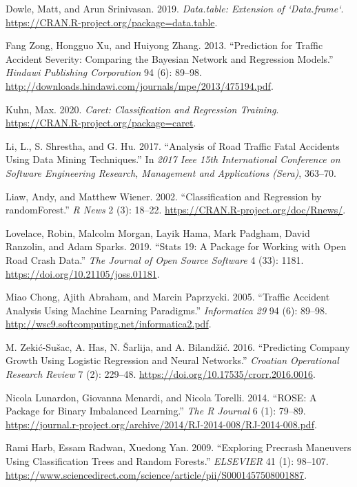 \documentclass[
  a4paper,
]{article}
\begin{document}
\leavevmode\hypertarget{ref-omit}{}%
Dowle, Matt, and Arun Srinivasan. 2019. \emph{Data.table: Extension of
`Data.frame`}. \url{https://CRAN.R-project.org/package=data.table}.

\leavevmode\hypertarget{ref-zong}{}%
Fang Zong, Hongguo Xu, and Huiyong Zhang. 2013. ``Prediction for Traffic
Accident Severity: Comparing the Bayesian Network and Regression
Models.'' \emph{Hindawi Publishing Corporation} 94 (6): 89--98.
\url{http://downloads.hindawi.com/journals/mpe/2013/475194.pdf}.

\leavevmode\hypertarget{ref-caret}{}%
Kuhn, Max. 2020. \emph{Caret: Classification and Regression Training}.
\url{https://CRAN.R-project.org/package=caret}.

\leavevmode\hypertarget{ref-7965753}{}%
Li, L., S. Shrestha, and G. Hu. 2017. ``Analysis of Road Traffic Fatal
Accidents Using Data Mining Techniques.'' In \emph{2017 Ieee 15th
International Conference on Software Engineering Research, Management
and Applications (Sera)}, 363--70.

\leavevmode\hypertarget{ref-random}{}%
Liaw, Andy, and Matthew Wiener. 2002. ``Classification and Regression by
randomForest.'' \emph{R News} 2 (3): 18--22.
\url{https://CRAN.R-project.org/doc/Rnews/}.

\leavevmode\hypertarget{ref-stats}{}%
Lovelace, Robin, Malcolm Morgan, Layik Hama, Mark Padgham, David
Ranzolin, and Adam Sparks. 2019. ``Stats 19: A Package for Working with
Open Road Crash Data.'' \emph{The Journal of Open Source Software} 4
(33): 1181. \url{https://doi.org/10.21105/joss.01181}.

\leavevmode\hypertarget{ref-Informatica}{}%
Miao Chong, Ajith Abraham, and Marcin Paprzycki. 2005. ``Traffic
Accident Analysis Using Machine Learning Paradigms.'' \emph{Informatica
29} 94 (6): 89--98.
\url{http://wsc9.softcomputing.net/informatica2.pdf}.

\leavevmode\hypertarget{ref-zekic}{}%
M. Zekić-Sušac, A. Has, N. Šarlija, and A. Bilandžić. 2016. ``Predicting
Company Growth Using Logistic Regression and Neural Networks.''
\emph{Croatian Operational Research Review} 7 (2): 229--48.
\url{https://doi.org/10.17535/crorr.2016.0016}.

\leavevmode\hypertarget{ref-rose}{}%
Nicola Lunardon, Giovanna Menardi, and Nicola Torelli. 2014. ``ROSE: A
Package for Binary Imbalanced Learning.'' \emph{The R Journal} 6 (1):
79--89.
\url{https://journal.r-project.org/archive/2014/RJ-2014-008/RJ-2014-008.pdf}.

\leavevmode\hypertarget{ref-harb}{}%
Rami Harb, Essam Radwan, Xuedong Yan. 2009. ``Exploring Precrash
Maneuvers Using Classification Trees and Random Forests.''
\emph{ELSEVIER} 41 (1): 98--107.
\url{https://www.sciencedirect.com/science/article/pii/S0001457508001887}.
\end{document}

